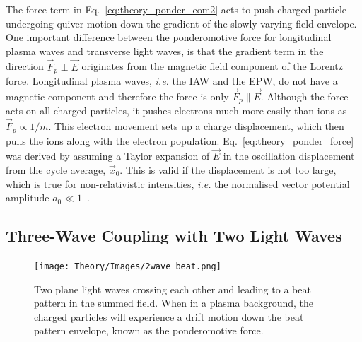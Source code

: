 The force term in Eq.~\ref{eq:theory_ponder_eom2} acts to push charged particle undergoing quiver motion down the gradient of the slowly varying field envelope.
One important difference between the ponderomotive force for longitudinal plasma waves and transverse light waves, is that the gradient term in the direction $\vec{F}_p\perp\vec{E}$ originates from the magnetic field component of the Lorentz force.
Longitudinal plasma waves, \textit{i.e.} the \ac{IAW} and the \ac{EPW}, do not have a magnetic component and therefore the force is only $\vec{F}_p\parallel\vec{E}$.
Although the force acts on all charged particles, it pushes electrons much more easily than ions as $\vec{F}_p\propto 1/m$.
This electron movement sets up a charge displacement, which then pulls the ions along with the electron population.
Eq.~\ref{eq:theory_ponder_force} was derived by assuming a Taylor expansion of $\vec{E}$ in the oscillation displacement from the cycle average, $\vec{x}_0$.
This is valid if the displacement is not too large, which is true for non-relativistic intensities, \textit{i.e.} the normalised vector potential amplitude $a_0\ll 1$~\cite{michel_introduction_2023}.

\subsection{Three-Wave Coupling with Two Light Waves}%
\label{sec:theory_threewave}

\begin{figure}[t!]
    \texttt{[image: Theory/Images/2wave\_beat.png]}
    \centering
    \caption{Two plane light waves crossing each other and leading to a beat pattern in the summed field.
    When in a plasma background, the charged particles will experience a drift motion down the beat pattern envelope, known as the ponderomotive force.}%
    \label{fig:theory_twowavebeat}
\end{figure}


